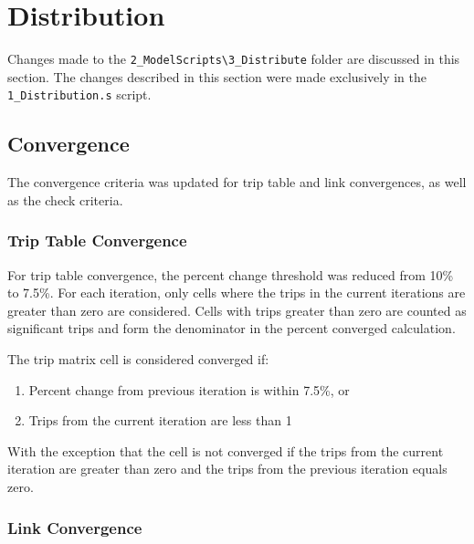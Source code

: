 \documentclass[
  letterpaper,
  DIV=11,
  numbers=noendperiod]{scrreprt}
\providecommand{\tightlist}{%
  \setlength{\itemsep}{0pt}\setlength{\parskip}{0pt}}\usepackage{longtable,booktabs,array}
\begin{document}

\hypertarget{distribution}{%
\chapter{Distribution}\label{distribution}}

Changes made to the
\texttt{2\_ModelScripts\textbackslash{}3\_Distribute} folder are
discussed in this section. The changes described in this section were
made exclusively in the \texttt{1\_Distribution.s} script.

\hypertarget{convergence}{%
\section{Convergence}\label{convergence}}

The convergence criteria was updated for trip table and link
convergences, as well as the check criteria.

\hypertarget{trip-table-convergence}{%
\subsection{Trip Table Convergence}\label{trip-table-convergence}}

For trip table convergence, the percent change threshold was reduced
from 10\% to 7.5\%. For each iteration, only cells where the trips in
the current iterations are greater than zero are considered. Cells with
trips greater than zero are counted as significant trips and form the
denominator in the percent converged calculation.

The trip matrix cell is considered converged if:

\begin{enumerate}
\def\labelenumi{\arabic{enumi}.}
\tightlist
\item
  Percent change from previous iteration is within 7.5\%, or
\item
  Trips from the current iteration are less than 1
\end{enumerate}

With the exception that the cell is not converged if the trips from the
current iteration are greater than zero and the trips from the previous
iteration equals zero.

\hypertarget{link-convergence}{%
\subsection{Link Convergence}\label{link-convergence}}
\end{document}
